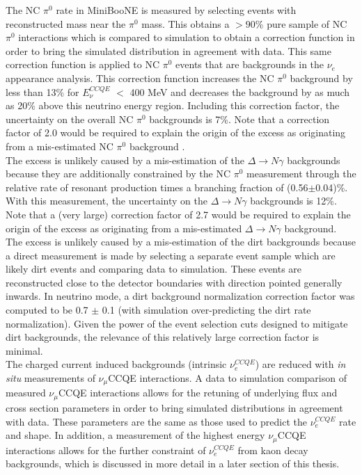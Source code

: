 The NC $\pi^0$ rate in MiniBooNE is measured by selecting events with reconstructed mass near the $\pi^0$ mass. This obtains a $>90$\% pure sample of NC $\pi^0$ interactions which is compared to simulation to obtain a correction function in order to bring the simulated distribution in agreement with data. This same correction function is applied to NC $\pi^0$ events that are backgrounds in the $\nu_e$ appearance analysis. This correction function increases the NC $\pi^0$ background by less than 13\% for $E_\nu^{CCQE}$ $<$ 400 MeV and decreases the background by as much as 20\% above this neutrino energy region. Including this correction factor, the uncertainty on the overall NC $\pi^0$ backgrounds is 7\%. Note that a correction factor of 2.0 would be required to explain the origin of the excess as originating from a mis-estimated NC $\pi^0$ background \cite{GeorgiaThesis}.\\

The excess is unlikely caused by a mis-estimation of the $\Delta\rightarrow N\gamma$ backgrounds because they are additionally constrained by the NC $\pi^0$ measurement through the relative rate of resonant production times a branching fraction of (0.56$\pm$0.04)\%. With this measurement, the uncertainty on the $\Delta\rightarrow N\gamma$ backgrounds is 12\%. Note that a (very large) correction factor of 2.7 would be required to explain the origin of the excess as originating from a mis-estimated $\Delta \rightarrow N\gamma$ background.\\

The excess is unlikely caused by a mis-estimation of the dirt backgrounds because a direct measurement is made by selecting a separate event sample which are likely dirt events and comparing data to simulation. These events are reconstructed close to the detector boundaries with direction pointed generally inwards. In neutrino mode, a dirt background normalization correction factor was computed to be 0.7 $\pm$ 0.1 (with simulation over-predicting the dirt rate normalization). Given the power of the event selection cuts designed to mitigate dirt backgrounds, the relevance of this relatively large correction factor is minimal.\\

The charged current induced backgrounds (intrinsic $\nu_e^{CCQE}$) are reduced with \textit{in situ} measurements of $\nu_\mu$CCQE interactions. A data to simulation comparison of measured $\nu_\mu$CCQE interactions allows for the retuning of underlying flux and cross section parameters in order to bring simulated distributions in agreement with data. These parameters are the same as those used to predict the $\nu_e^{CCQE}$ rate and shape. In addition, a measurement of the highest energy $\nu_\mu$CCQE interactions allows for the further constraint of $\nu_e^{CCQE}$ from kaon decay backgrounds, which is discussed in more detail in a later section of this thesis.\\

